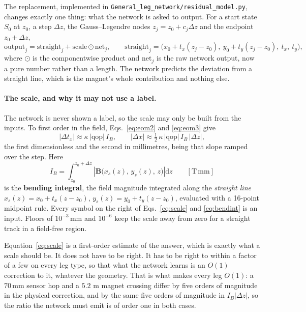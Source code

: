 \documentclass[11pt,a4paper]{article}
\newcommand{\mm}{\ensuremath{\,\mathrm{mm}}}
\newcommand{\qop}{\ensuremath{\mathrm{qop}}}
\begin{document}
The replacement, implemented in
\texttt{General\_leg\_network/residual\_model.py}, changes exactly one thing:
what the network is asked to output. For a start state $S_0$ at $z_0$, a step
$\Delta z$, the Gauss--Legendre nodes $z_j = z_0 + c_j \Delta z$ and the
endpoint $z_0 + \Delta z$,
%
\begin{equation}
  \mathrm{output}_j = \mathrm{straight}_j + \mathrm{scale} \odot \mathrm{net}_j,
  \qquad
  \mathrm{straight}_j = \big(x_0 + t_x (z_j - z_0),\
                             y_0 + t_y (z_j - z_0),\ t_x,\ t_y\big),
  \label{eq:residual}
\end{equation}
%
where $\odot$ is the componentwise product and $\mathrm{net}_j$ is the raw
network output, now a pure number rather than a length. The network predicts the
deviation from a straight line, which is the magnet's whole contribution and
nothing else.

\paragraph{The scale, and why it may not use a label.}
The network is never shown a label, so the scale may only be built from the
inputs. To first order in the field, Eqs.~\eqref{eq:eom2} and \eqref{eq:eom3}
give
%
\begin{equation}
  |\Delta t_x| \approx \kappa\,|\qop|\,I_B,
  \qquad
  |\Delta x| \approx \tfrac12\,\kappa\,|\qop|\,I_B\,|\Delta z|,
  \label{eq:scale}
\end{equation}
%
the first dimensionless and the second in millimetres, being that slope ramped
over the step. Here
%
\begin{equation}
  I_B = \int_{z_0}^{z_0 + \Delta z}
        \left|\mathbf{B}\big(x_s(z),\, y_s(z),\, z\big)\right| \mathrm{d}z
  \qquad [\mathrm{T}\,\mathrm{mm}]
  \label{eq:bendint}
\end{equation}
%
is the \textbf{bending integral}, the field magnitude integrated along the
\emph{straight line} $x_s(z) = x_0 + t_x (z - z_0)$,
$y_s(z) = y_0 + t_y (z - z_0)$, evaluated with a 16-point midpoint rule. Every
symbol on the right of Eqs.~\eqref{eq:scale} and \eqref{eq:bendint} is an input.
Floors of $10^{-3}\mm$ and $10^{-6}$ keep the scale away from zero for a
straight track in a field-free region.

Equation~\eqref{eq:scale} is a first-order estimate of the answer, which is
exactly what a scale should be. It does not have to be right. It has to be right
to within a factor of a few on every leg type, so that what the network learns is
an $O(1)$ correction to it, whatever the geometry. That is what makes every leg
$O(1)$: a $70\mm$ sensor hop and a $5.2$ m magnet crossing differ by five orders
of magnitude in the physical correction, and by the same five orders of
magnitude in $I_B |\Delta z|$, so the ratio the network must emit is of order one
in both cases.
\end{document}
